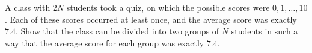 A class with $2N$ students took a quiz, on which the possible scores were $0,1,\dots,10$. Each of these scores
occurred at least once, and the average score was exactly $7.4$. Show that the class can be divided into two groups of $N$ students in such a way that the average score for each group was exactly $7.4$.
